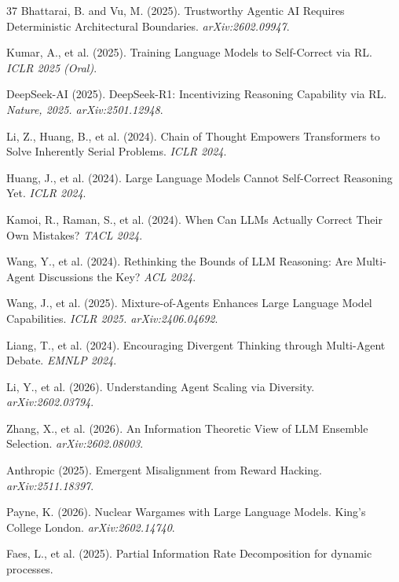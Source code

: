 \documentclass[11pt,a4paper]{article}
\theoremstyle{definition}
\begin{document}
\begin{thebibliography}{37}
Bhattarai, B. and Vu, M. (2025).
\newblock Trustworthy Agentic AI Requires Deterministic Architectural Boundaries.
\newblock \emph{arXiv:2602.09947}.

Kumar, A., et al. (2025).
\newblock Training Language Models to Self-Correct via RL.
\newblock \emph{ICLR 2025 (Oral)}.

DeepSeek-AI (2025).
\newblock DeepSeek-R1: Incentivizing Reasoning Capability via RL.
\newblock \emph{Nature, 2025. arXiv:2501.12948}.

Li, Z., Huang, B., et al. (2024).
\newblock Chain of Thought Empowers Transformers to Solve Inherently Serial Problems.
\newblock \emph{ICLR 2024}.

Huang, J., et al. (2024).
\newblock Large Language Models Cannot Self-Correct Reasoning Yet.
\newblock \emph{ICLR 2024}.

Kamoi, R., Raman, S., et al. (2024).
\newblock When Can LLMs Actually Correct Their Own Mistakes?
\newblock \emph{TACL 2024}.

Wang, Y., et al. (2024).
\newblock Rethinking the Bounds of LLM Reasoning: Are Multi-Agent Discussions the Key?
\newblock \emph{ACL 2024}.

Wang, J., et al. (2025).
\newblock Mixture-of-Agents Enhances Large Language Model Capabilities.
\newblock \emph{ICLR 2025. arXiv:2406.04692}.

Liang, T., et al. (2024).
\newblock Encouraging Divergent Thinking through Multi-Agent Debate.
\newblock \emph{EMNLP 2024}.

Li, Y., et al. (2026).
\newblock Understanding Agent Scaling via Diversity.
\newblock \emph{arXiv:2602.03794}.

Zhang, X., et al. (2026).
\newblock An Information Theoretic View of LLM Ensemble Selection.
\newblock \emph{arXiv:2602.08003}.

Anthropic (2025).
\newblock Emergent Misalignment from Reward Hacking.
\newblock \emph{arXiv:2511.18397}.

Payne, K. (2026).
\newblock Nuclear Wargames with Large Language Models.
\newblock King's College London. \emph{arXiv:2602.14740}.

Faes, L., et al. (2025).
\newblock Partial Information Rate Decomposition for dynamic processes.

\end{thebibliography}
\end{document}
